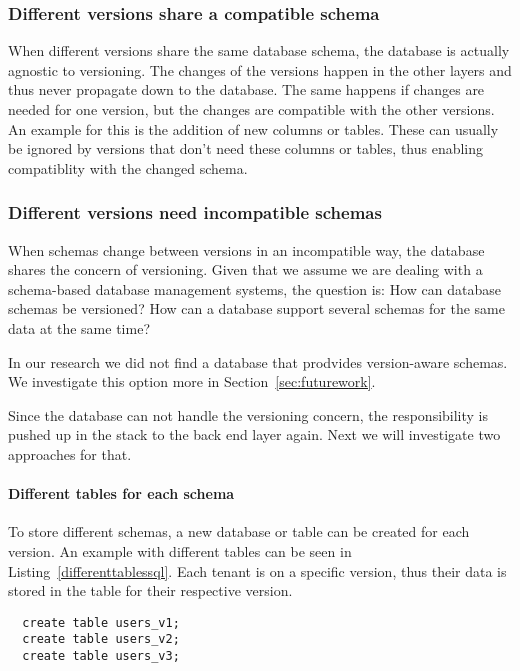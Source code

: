 \subsubsection{Different versions share a compatible schema}

When different versions share the same database schema, the database is actually agnostic to versioning. The changes of the versions happen in the other layers and thus never propagate down to the database. The same happens if changes are needed for one version, but the changes are compatible with the other versions. An example for this is the addition of new columns or tables. These can usually be ignored by versions that don't need these columns or tables, thus enabling compatiblity with the changed schema.

\subsubsection{Different versions need incompatible schemas}

When schemas change between versions in an incompatible way, the database shares the concern of versioning. Given that we assume we are dealing with a schema-based database management systems, the question is: How can database schemas be versioned? How can a database support several schemas for the same data at the same time?

In our research we did not find a database that prodvides version-aware schemas. We investigate this option more in Section~\ref{sec:futurework}.


Since the database can not handle the versioning concern, the responsibility is pushed up in the stack to the back end layer again. Next we will investigate two approaches for that.

\paragraph{Different tables for each schema}

To store different schemas, a new database or table can be created for each version. An example with different tables can be seen in Listing~\ref{differenttablessql}. Each tenant is on a specific version, thus their data is stored in the table for their respective version.

\lstset{language=SQL, caption=sql, label=differenttablessql}
\begin{lstlisting}
  create table users_v1;
  create table users_v2;
  create table users_v3;
\end{lstlisting}

